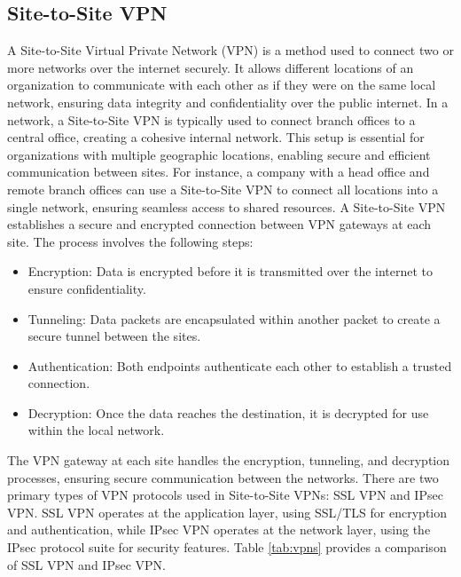 \documentclass[12pt]{report}
\begin{document}
\subsection{Site-to-Site VPN}
A Site-to-Site Virtual Private Network (VPN) is a method used to connect two or more networks over the internet securely. It allows different locations of an organization to communicate with each other as if they were on the same local network, ensuring data integrity and confidentiality over the public internet.
In a network, a Site-to-Site VPN is typically used to connect branch offices to a central office, creating a cohesive internal network. This setup is essential for organizations with multiple geographic locations, enabling secure and efficient communication between sites. For instance, a company with a head office and remote branch offices can use a Site-to-Site VPN to connect all locations into a single network, ensuring seamless access to shared resources.
A Site-to-Site VPN establishes a secure and encrypted connection between VPN gateways at each site. The process involves the following steps:
\begin{itemize}
    \item Encryption: Data is encrypted before it is transmitted over the internet to ensure confidentiality.
    \item Tunneling: Data packets are encapsulated within another packet to create a secure tunnel between the sites.
    \item Authentication: Both endpoints authenticate each other to establish a trusted connection.
    \item Decryption: Once the data reaches the destination, it is decrypted for use within the local network.
\end{itemize}
The VPN gateway at each site handles the encryption, tunneling, and decryption processes, ensuring secure communication between the networks.
There are two primary types of VPN protocols used in Site-to-Site VPNs: SSL VPN and IPsec VPN. SSL VPN operates at the application layer, using SSL/TLS for encryption and authentication, while IPsec VPN operates at the network layer, using the IPsec protocol suite for security features. Table \ref{tab:vpns} provides a comparison of SSL VPN and IPsec VPN.
\end{document}
